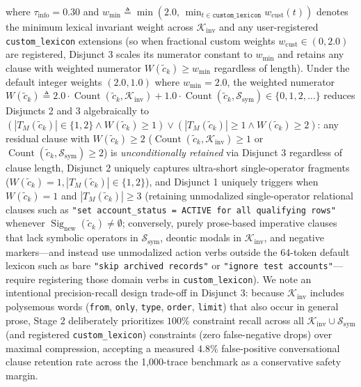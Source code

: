 \documentclass[conference,10pt]{IEEEtran}
\begin{document}
where $\tau_{\text{info}} = 0.30$ and $w_{\min} \triangleq \min(2.0,\, \min_{t \in \texttt{custom\_lexicon}} w_{\text{cust}}(t))$ denotes the minimum lexical invariant weight across $\mathcal{K}_{\text{inv}}$ and any user-registered \texttt{custom\_lexicon} extensions (so when fractional custom weights $w_{\text{cust}} \in (0, 2.0)$ are registered, Disjunct 3 scales its numerator constant to $w_{\min}$ and retains any clause with weighted numerator $W(\tilde{c}_k) \ge w_{\min}$ regardless of length). Under the default integer weights $(2.0, 1.0)$ where $w_{\min} = 2.0$, the weighted numerator $W(\tilde{c}_k) \triangleq 2.0 \cdot \operatorname{Count}(\tilde{c}_k, \mathcal{K}_{\text{inv}}) + 1.0 \cdot \operatorname{Count}(\tilde{c}_k, \mathcal{S}_{\text{sym}}) \in \{0, 1, 2, \dots\}$ reduces Disjuncts 2 and 3 algebraically to $(|T_M(\tilde{c}_k)| \in \{1, 2\} \land W(\tilde{c}_k) \ge 1) \lor (|T_M(\tilde{c}_k)| \ge 1 \land W(\tilde{c}_k) \ge 2)$: any residual clause with $W(\tilde{c}_k) \ge 2$ ($\operatorname{Count}(\tilde{c}_k, \mathcal{K}_{\text{inv}}) \ge 1$ or $\operatorname{Count}(\tilde{c}_k, \mathcal{S}_{\text{sym}}) \ge 2$) is \textit{unconditionally retained} via Disjunct 3 regardless of clause length, Disjunct 2 uniquely captures ultra-short single-operator fragments ($W(\tilde{c}_k) = 1, |T_M(\tilde{c}_k)| \in \{1, 2\}$), and Disjunct 1 uniquely triggers when $W(\tilde{c}_k) = 1$ and $|T_M(\tilde{c}_k)| \ge 3$ (retaining unmodalized single-operator relational clauses such as \texttt{"set account\_status = \textquotesingle ACTIVE\textquotesingle\ for all qualifying rows"} whenever $\operatorname{Sig}_{\text{new}}(\tilde{c}_k) \neq \emptyset$; conversely, purely prose-based imperative clauses that lack symbolic operators in $\mathcal{S}_{\text{sym}}$, deontic modals in $\mathcal{K}_{\text{inv}}$, and negative markers---and instead use unmodalized action verbs outside the 64-token default lexicon such as bare \texttt{"skip archived records"} or \texttt{"ignore test accounts"}---require registering those domain verbs in \texttt{custom\_lexicon}). We note an intentional precision-recall design trade-off in Disjunct 3: because $\mathcal{K}_{\text{inv}}$ includes polysemous words (\texttt{from}, \texttt{only}, \texttt{type}, \texttt{order}, \texttt{limit}) that also occur in general prose, Stage 2 deliberately prioritizes $100\%$ constraint recall across all $\mathcal{K}_{\text{inv}} \cup \mathcal{S}_{\text{sym}}$ (and registered \texttt{custom\_lexicon}) constraints (zero false-negative drops) over maximal compression, accepting a measured $4.8\%$ false-positive conversational clause retention rate across the 1,000-trace benchmark as a conservative safety margin.
\end{document}
